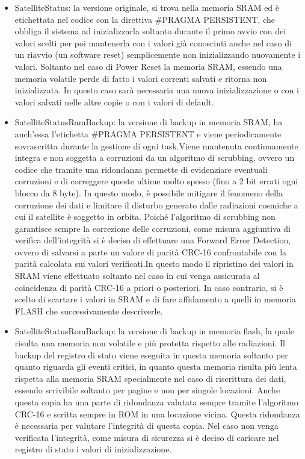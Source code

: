 \documentclass[LaM,binding=0.6cm]{../sapthesis}
\begin{document}
\begin{itemize}
    \item SatelliteStatus: la versione originale, si trova nella memoria SRAM ed è etichettata nel codice con la direttiva \#PRAGMA PERSISTENT, che obbliga il sistema ad inizializzarla soltanto durante il primo avvio con dei valori scelti per poi mantenerla con i valori già conosciuti anche nel caso di un riavvio (un software reset) semplicemente non inizializzando nuovamente i valori. 
    Soltanto nel caso di Power Reset la memoria SRAM, essendo una memoria volatile perde di fatto i valori correnti salvati e ritorna non inizializzata. In questo caso sarà necessaria una nuova inizializzazione o con i valori salvati nelle altre copie o con i valori di default.
    
    \item SatelliteStatusRamBackup: la versione di backup in memoria SRAM, ha anch’essa l’etichetta \#PRAGMA PERSISTENT e viene periodicamente sovrascritta durante la gestione di ogni task.Viene mantenuta continuamente integra e non soggetta a corruzioni da un algoritmo di scrubbing, ovvero un codice che tramite una ridondanza permette di evidenziare eventuali corruzioni e di correggere queste ultime molto spesso  (fino a 2 bit errati ogni blocco da 8 byte).
     In questo modo, è possibile mitigare il fenomeno della corruzione dei dati e limitare il disturbo generato dalle radiazioni cosmiche a cui il satellite è soggetto in orbita.
    Poiché l’algoritmo di scrubbing non garantisce sempre la correzione delle corruzioni, come misura aggiuntiva di verifica dell’integrità si è deciso di effettuare una Forward Error Detection, ovvero di salvarsi a parte un valore di parità CRC-16 confrontabile con la parità calcolata sui valori verificati.In questo modo il ripristino dei valori in SRAM viene effettuato soltanto nel caso in cui venga assicurata al coincidenza di parità CRC-16 a priori o posteriori. In caso contrario, si è scelto di scartare i valori in SRAM e di fare affidamento a quelli in memoria FLASH che successivamente descriverle.
    
    \item SatelliteStatusRomBackup: la versione di backup in memoria flash, la quale risulta una memoria non volatile e più protetta rispetto alle radiazioni. 
Il backup del registro di stato viene eseguita in questa memoria soltanto per quanto riguarda gli eventi critici, in quanto questa memoria risulta più lenta rispetta alla memoria SRAM specialmente nel caso di riscrittura dei dati, essendo scrivibile soltanto per pagine e non per singole locazioni.
Anche questa copia ha una parte di ridondanza valutata sempre tramite l’algoritmo CRC-16 e scritta sempre in ROM in una locazione vicina. Questa ridondanza è necessaria per valutare l’integrità di questa copia. Nel caso non venga verificata l’integrità, come misura di sicurezza si è deciso di caricare nel registro di stato i valori di inizializzazione.
\end{itemize}
\end{document}
